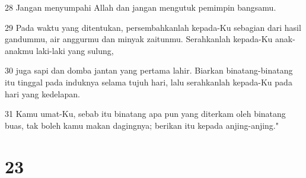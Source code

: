 \par 28 Jangan menyumpahi Allah dan jangan mengutuk pemimpin bangsamu.
\par 29 Pada waktu yang ditentukan, persembahkanlah kepada-Ku sebagian dari hasil gandummu, air anggurmu dan minyak zaitunmu. Serahkanlah kepada-Ku anak-anakmu laki-laki yang sulung,
\par 30 juga sapi dan domba jantan yang pertama lahir. Biarkan binatang-binatang itu tinggal pada induknya selama tujuh hari, lalu serahkanlah kepada-Ku pada hari yang kedelapan.
\par 31 Kamu umat-Ku, sebab itu binatang apa pun yang diterkam oleh binatang buas, tak boleh kamu makan dagingnya; berikan itu kepada anjing-anjing."

\chapter{23}

